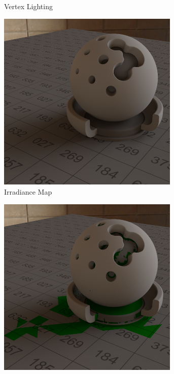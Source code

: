 \begin{figure}[h]
\begin{subfigure}[t]{0.245\textwidth}
				\caption{Vertex Lighting}
			\end{subfigure}
			\begin{subfigure}[t]{0.245\textwidth}
				\center
				\includegraphics[width=0.95\textwidth]{pic/irrmap-shaderball_e-irrmap.png}
				\caption{Irradiance Map}
			\end{subfigure}
			\begin{subfigure}[t]{0.245\textwidth}
				\center
				\includegraphics[width=0.95\textwidth]{pic/irrmap-shaderball_e-irrmap-order.png}

\end{subfigure}
\end{figure}

